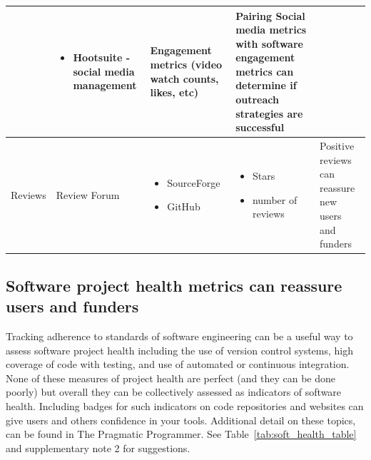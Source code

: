 \documentclass{article}
\begin{document}
\begin{table}[ht!]
\begin{tabular} {|p{}|p{}|p{}|p{}|p{}|}
\begin{itemize}
    \end{itemize} & 
    \begin{itemize}
        \item Hootsuite \cite{hootsuite} - social media management
    \end{itemize} &   Engagement metrics (video watch counts, likes, etc)  & Pairing Social media  metrics with software engagement metrics can determine if outreach strategies are successful \\
    \hline
       \multirow{3}{*}{Reviews}
    & Review Forum & 
    \begin{itemize}
        \item SourceForge
        \item GitHub
    \end{itemize} &  \begin{itemize}
        \item Stars
        \item number of reviews
    \end{itemize} & Positive reviews can reassure new users and funders\\ 
    \hline
  \end{tabular}
  \label{tab:inf_table}
\end{table}



\subsection{Software project health metrics can reassure users and funders}
Tracking adherence to standards of software engineering can be a useful way to assess software project health including the use of version control systems, high coverage of code with testing, and use of automated or continuous integration. None of these measures of project health are perfect (and they can be done poorly) but overall they can be collectively assessed as indicators of software health. Including badges for such indicators on code repositories and websites can give users and others confidence in your tools.  Additional detail on these topics, can be found in The Pragmatic Programmer\cite{thomas_pragmatic_2019}. See Table~\ref{tab:soft_health_table} and supplementary note 2 for suggestions.
\end{document}
